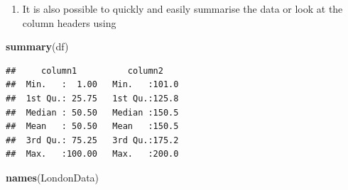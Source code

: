 \documentclass[]{book}
\newenvironment{Shaded}{\begin{snugshade}}{\end{snugshade}}
\newcommand{\KeywordTok}[1]{\textcolor[rgb]{0.13,0.29,0.53}{\textbf{#1}}}
\newcommand{\NormalTok}[1]{#1}
\providecommand{\tightlist}{%
  \setlength{\itemsep}{0pt}\setlength{\parskip}{0pt}}
\begin{document}
\begin{enumerate}
\def\labelenumi{\arabic{enumi}.}
\setcounter{enumi}{26}
\tightlist
\item
  It is also possible to quickly and easily summarise the data or look at the column headers using
\end{enumerate}

\begin{Shaded}
\begin{Highlighting}[]
\KeywordTok{summary}\NormalTok{(df)}
\end{Highlighting}
\end{Shaded}

\begin{verbatim}
##     column1          column2     
##  Min.   :  1.00   Min.   :101.0  
##  1st Qu.: 25.75   1st Qu.:125.8  
##  Median : 50.50   Median :150.5  
##  Mean   : 50.50   Mean   :150.5  
##  3rd Qu.: 75.25   3rd Qu.:175.2  
##  Max.   :100.00   Max.   :200.0
\end{verbatim}

\begin{Shaded}
\begin{Highlighting}[]
\KeywordTok{names}\NormalTok{(LondonData)}
\end{Highlighting}
\end{Shaded}
\end{document}
